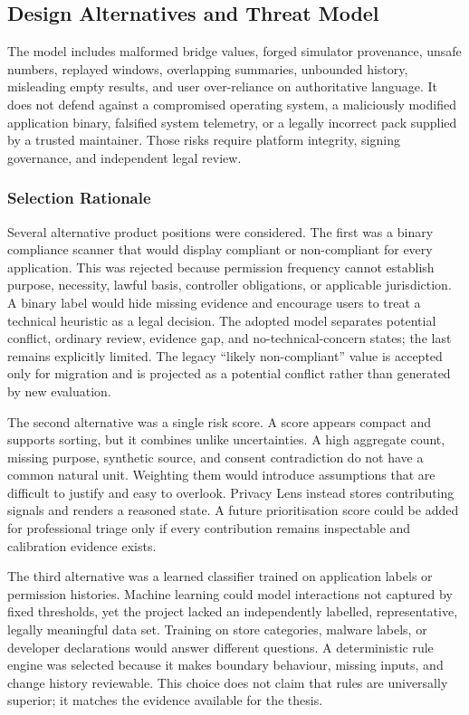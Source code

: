 \subsection{Design Alternatives and Threat Model}

The model includes malformed bridge values, forged simulator provenance, unsafe numbers, replayed windows, overlapping summaries, unbounded history, misleading empty results, and user over-reliance on authoritative language. It does not defend against a compromised operating system, a maliciously modified application binary, falsified system telemetry, or a legally incorrect pack supplied by a trusted maintainer. Those risks require platform integrity, signing governance, and independent legal review.

\subsubsection{Selection Rationale}

Several alternative product positions were considered. The first was a binary compliance scanner that would display compliant or non-compliant for every application. This was rejected because permission frequency cannot establish purpose, necessity, lawful basis, controller obligations, or applicable jurisdiction. A binary label would hide missing evidence and encourage users to treat a technical heuristic as a legal decision. The adopted model separates potential conflict, ordinary review, evidence gap, and no-technical-concern states; the last remains explicitly limited. The legacy ``likely non-compliant'' value is accepted only for migration and is projected as a potential conflict rather than generated by new evaluation.

The second alternative was a single risk score. A score appears compact and supports sorting, but it combines unlike uncertainties. A high aggregate count, missing purpose, synthetic source, and consent contradiction do not have a common natural unit. Weighting them would introduce assumptions that are difficult to justify and easy to overlook. Privacy Lens instead stores contributing signals and renders a reasoned state. A future prioritisation score could be added for professional triage only if every contribution remains inspectable and calibration evidence exists.

The third alternative was a learned classifier trained on application labels or permission histories. Machine learning could model interactions not captured by fixed thresholds, yet the project lacked an independently labelled, representative, legally meaningful data set. Training on store categories, malware labels, or developer declarations would answer different questions. A deterministic rule engine was selected because it makes boundary behaviour, missing inputs, and change history reviewable. This choice does not claim that rules are universally superior; it matches the evidence available for the thesis.

